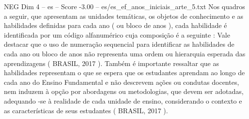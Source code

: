 \begin{textsample}{NEG Dim 4 – es – Score -3.00 – es/es\_ef\_anos\_iniciais\_arte\_5.txt}
Nos quadros a seguir, que apresentam as unidades temáticas, os objetos de conhecimento e as habilidades definidas para cada ano ( ou bloco de anos ), cada habilidade é identificada por um código alfanumérico cuja composição é a seguinte : Vale destacar que o uso de numeração sequencial para identificar as habilidades de cada ano ou bloco de anos não representa uma ordem ou hierarquia esperada das aprendizagens ( BRASIL, 2017 ).
Também é importante ressaltar que as habilidades representam o que se espera que os estudantes aprendam ao longo de cada ano do Ensino Fundamental e não descrevem ações ou condutas docentes, nem induzem à opção por abordagens ou metodologias, que devem ser adotadas, adequando -se à realidade de cada unidade de ensino, considerando o contexto e as características de seus estudantes ( BRASIL, 2017 ).

\end{textsample}
